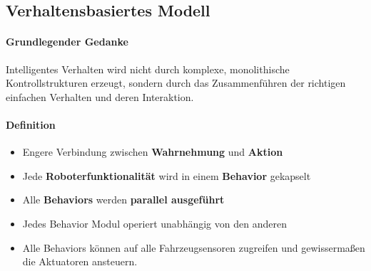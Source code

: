\subsection{Verhaltensbasiertes Modell}
\paragraph{Grundlegender Gedanke} Intelligentes Verhalten wird nicht durch komplexe, monolithische Kontrollstrukturen erzeugt, sondern durch das Zusammenführen der richtigen einfachen Verhalten und deren Interaktion.
\paragraph{Definition}
\begin{itemize}
	\item Engere Verbindung zwischen \textbf{Wahrnehmung} und \textbf{Aktion}
	\item Jede \textbf{Roboterfunktionalität} wird in einem \textbf{Behavior} gekapselt
	\item Alle \textbf{Behaviors} werden \textbf{parallel ausgeführt}
	\item Jedes Behavior Modul operiert unabhängig von den anderen
	\item Alle Behaviors können auf alle Fahrzeugsensoren zugreifen und gewissermaßen die Aktuatoren ansteuern.
\end{itemize}
\newpage
